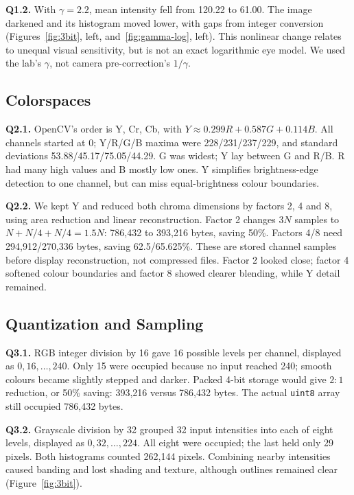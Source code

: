 \documentclass[10pt,a4paper]{article}
\begin{document}
\textbf{Q1.2.} With \(\gamma=2.2\), mean intensity fell from 120.22 to 61.00.
The image darkened and its histogram moved lower, with gaps from integer
conversion (Figures~\ref{fig:3bit}, left, and~\ref{fig:gamma-log}, left). This nonlinear change relates to unequal
visual sensitivity, but is not an exact logarithmic eye model. We used the
lab's \(\gamma\), not camera pre-correction's \(1/\gamma\).


\subsection{Colorspaces}
\textbf{Q2.1.} OpenCV's order is Y, Cr, Cb, with
\(Y\approx0.299R+0.587G+0.114B\). All channels started at 0; Y/R/G/B maxima
were 228/231/237/229, and standard deviations 53.88/45.17/75.05/44.29.
G was widest; Y lay between G and R/B. R had many high values and B mostly low
ones. Y simplifies brightness-edge detection to one channel, but can miss
equal-brightness colour boundaries.

\textbf{Q2.2.} We kept Y and reduced both chroma dimensions by factors 2, 4 and
8, using area reduction and linear reconstruction. Factor 2 changes \(3N\)
samples to \(N+N/4+N/4=1.5N\): 786,432 to 393,216 bytes, saving 50\%.
Factors 4/8 need 294,912/270,336 bytes, saving 62.5/65.625\%.
These are stored channel samples before display reconstruction, not compressed
files. Factor 2 looked close; factor 4 softened colour boundaries and factor 8
showed clearer blending, while Y detail remained.

\subsection{Quantization and Sampling}
\textbf{Q3.1.} RGB integer division by 16 gave 16 possible levels per channel,
displayed as \(0,16,\ldots,240\). Only 15 were occupied because no input reached
240; smooth colours became slightly stepped and darker. Packed 4-bit storage
would give \(2{:}1\) reduction, or 50\% saving: 393,216 versus 786,432 bytes.
The actual \texttt{uint8} array still occupied 786,432 bytes.

\textbf{Q3.2.} Grayscale division by 32 grouped 32 input intensities into each
of eight levels, displayed as \(0,32,\ldots,224\). All eight were occupied;
the last held only 29 pixels. Both histograms counted 262,144 pixels.
Combining nearby intensities caused banding and lost shading and texture,
although outlines remained clear (Figure~\ref{fig:3bit}).
\end{document}
